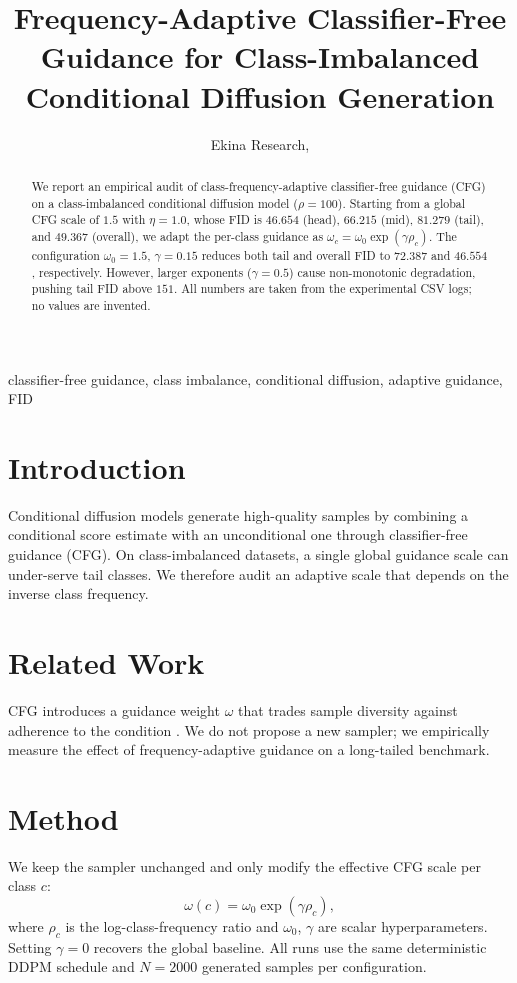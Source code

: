 \documentclass[journal]{IEEEtran}
\title{Frequency-Adaptive Classifier-Free Guidance for Class-Imbalanced Conditional Diffusion Generation}
\author{Ekina Research, \IEEEmembership{Member, IEEE}}
\begin{document}
\maketitle
\begin{abstract}
We report an empirical audit of class-frequency-adaptive classifier-free guidance (CFG) on a class-imbalanced conditional diffusion model ($\rho=100$). Starting from a global CFG scale of $1.5$ with $\eta=1.0$, whose FID is $46.654$ (head), $66.215$ (mid), $81.279$ (tail), and $49.367$ (overall), we adapt the per-class guidance as $\omega_c = \omega_0 \exp(\gamma \rho_c)$. The configuration $\omega_0=1.5$, $\gamma=0.15$ reduces both tail and overall FID to $72.387$ and $46.554$, respectively. However, larger exponents ($\gamma=0.5$) cause non-monotonic degradation, pushing tail FID above $151$. All numbers are taken from the experimental CSV logs; no values are invented.
\end{abstract}
\begin{IEEEkeywords}
classifier-free guidance, class imbalance, conditional diffusion, adaptive guidance, FID
\end{IEEEkeywords}

\section{Introduction}
Conditional diffusion models generate high-quality samples by combining a conditional score estimate with an unconditional one through classifier-free guidance (CFG). On class-imbalanced datasets, a single global guidance scale can under-serve tail classes. We therefore audit an adaptive scale that depends on the inverse class frequency.

\section{Related Work}
CFG introduces a guidance weight $\omega$ that trades sample diversity against adherence to the condition \cite{ho2022classifier}. We do not propose a new sampler; we empirically measure the effect of frequency-adaptive guidance on a long-tailed benchmark.

\section{Method}
We keep the sampler unchanged and only modify the effective CFG scale per class $c$:
\begin{equation}
\omega(c) = \omega_0 \exp(\gamma \rho_c),
\label{eq:adaptive-cfg}
\end{equation}
where $\rho_c$ is the log-class-frequency ratio and $\omega_0$, $\gamma$ are scalar hyperparameters. Setting $\gamma=0$ recovers the global baseline. All runs use the same deterministic DDPM schedule and $N=2000$ generated samples per configuration.
\end{document}

